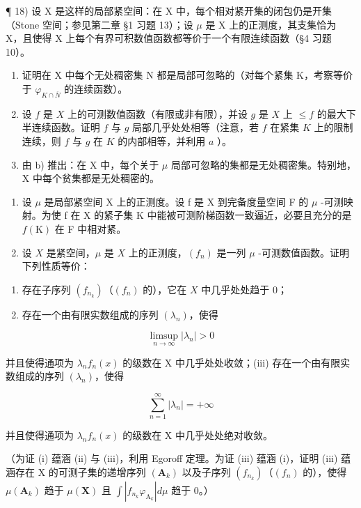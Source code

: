 ¶ 18) 设 X 是这样的局部紧空间：在 X 中，每个相对紧开集的闭包仍是开集（Stone 空间；参见第二章 §1 习题 13）；设 \(\mu\) 是 X 上的正测度，其支集恰为 X，且使得 X 上每个有界可积数值函数都等价于一个有限连续函数（§4 习题 10）。

\begin{enumerate}
\def\labelenumi{\alph{enumi})}
\item
  证明在 X 中每个无处稠密集 N 都是局部可忽略的（对每个紧集 K，考察等价于 \(\varphi_{K\cap \overline{N}}\) 的连续函数）。
\item
  设 \(f\) 是 \(X\) 上的可测数值函数（有限或非有限），并设 \(g\) 是 \(X\) 上 \(\leqslant f\) 的最大下半连续函数。证明 \(f\) 与 \(g\) 局部几乎处处相等（注意，若 \(f\) 在紧集 \(K\) 上的限制连续，则 \(f\) 与 \(g\) 在 \(K\) 的内部相等，并利用 \(a\) ）。
\item
  由 b) 推出：在 X 中，每个关于 \(\mu\) 局部可忽略的集都是无处稠密集。特别地，X 中每个贫集都是无处稠密的。
\end{enumerate}

\begin{enumerate}
\def\labelenumi{\arabic{enumi})}
\setcounter{enumi}{18}
\item
  设 \(\mu\) 是局部紧空间 X 上的正测度。设 f 是 X 到完备度量空间 F 的 \(\mu\) -可测映射。为使 f 在 X 的紧子集 K 中能被可测阶梯函数一致逼近，必要且充分的是 \(f(\mathrm{K})\) 在 F 中相对紧。
\item
  设 \(X\) 是紧空间，\(\mu\) 是 \(X\) 上的正测度，\((f_n)\) 是一列 \(\mu\) -可测数值函数。证明下列性质等价：
\end{enumerate}

\begin{enumerate}
\def\labelenumi{(\roman{enumi})}
\item
  存在子序列 \((f_{n_k})\)（\((f_n)\) 的），它在 \(X\) 中几乎处处趋于 0；
\item
  存在一个由有限实数组成的序列 \((\lambda_{n})\)，使得
\end{enumerate}

\[
\limsup _ {n \to \infty} | \lambda_ {n} | > 0
\]

并且使得通项为 \(\lambda_{n}f_{n}(x)\) 的级数在 X 中几乎处处收敛；(iii) 存在一个由有限实数组成的序列 \((\lambda_n)\)，使得

\[
\sum_ {n = 1} ^ {\infty} | \lambda_ {n} | = + \infty
\]

并且使得通项为 \(\lambda_{n}f_{n}(x)\) 的级数在 X 中几乎处处绝对收敛。

（为证 (i) 蕴涵 (ii) 与 (iii)，利用 Egoroff 定理。为证 (iii) 蕴涵 (i)，证明 (iii) 蕴涵存在 X 的可测子集的递增序列 \((\mathbf{A}_k)\) 以及子序列 \((f_{n_k})\)（\((f_n)\) 的），使得 \(\mu (\mathbf{A}_k)\) 趋于 \(\mu (\mathbf{X})\) 且 \(\int |f_{n_k}\varphi_{\mathrm{A}_k}|d\mu\) 趋于 0。）

